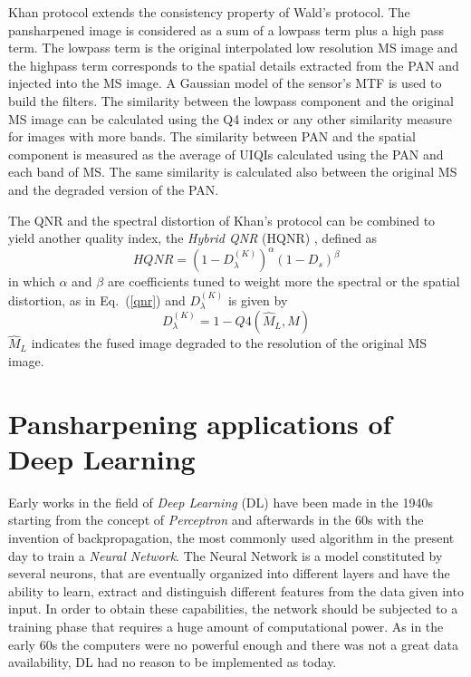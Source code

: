 \documentclass[12pt]{report}
\begin{document}
Khan protocol \cite{khan} extends the consistency property of Wald's protocol.
The pansharpened image is considered as a sum of a lowpass term plus a high pass term.
The lowpass term is the original interpolated low resolution MS image and
the highpass term corresponds to the spatial details extracted from the PAN and injected into the MS image.
A Gaussian model of the sensor's MTF is used to build the filters. The similarity between the lowpass component and
the original MS image can be calculated using the Q4 index or any other similarity measure for images with more bands.
The similarity between PAN and the spatial component is measured as the average of UIQIs calculated using the PAN and each band of MS.
The same similarity is calculated also between the original MS and the degraded version of the PAN.

The QNR and the spectral distortion of Khan's protocol can be combined to yield another quality index, the \textit{Hybrid QNR} (HQNR) \cite{hqnr}, defined as
%
\begin{equation}
    HQNR = (1 - D_\lambda^{(K)})^\alpha (1 - D_s)^\beta
    \label{hqnr}
\end{equation}
%
in which $\alpha$ and $\beta$ are coefficients tuned to weight more the spectral or the spatial distortion, as in Eq.~(\ref{qnr}) and $D_\lambda^{(K)}$ is given by
%
\begin{equation}
    D_\lambda^{(K)} = 1 - Q4(\widehat{M}_L, M)
    \label{dlhqnr}
\end{equation}
%
$\widehat{M}_L$ indicates the fused image degraded to the resolution of the original MS image. 


\chapter{Pansharpening applications of Deep Learning}


Early works in the field of \textit{Deep Learning }(DL) have been made in the 1940s starting from the concept of \textit{Perceptron} \cite{perceptron} and afterwards in the 60s with the invention
of backpropagation, the most commonly used algorithm in the present day to train a \textit{Neural Network}.
The Neural Network is a model constituted by several neurons, that are eventually organized into different layers and have the ability to learn, extract and distinguish different features from the data given into input.
In order to obtain these capabilities, the network should be subjected to a training phase that requires a huge amount of
computational power.
As in the early 60s the computers were no powerful enough and there was not a great data availability,
DL had no reason to be implemented as today.
\end{document}
